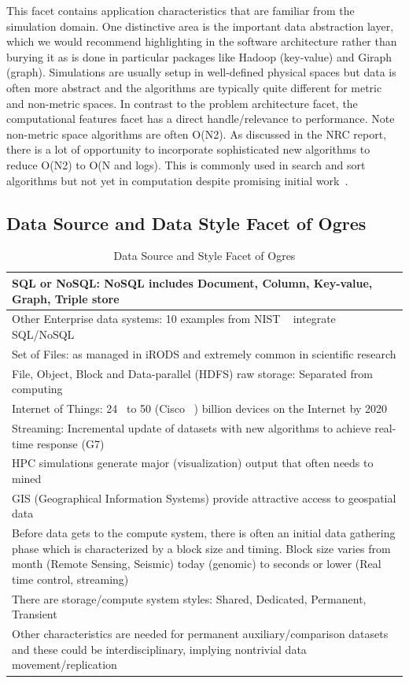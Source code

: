 \documentclass{acm_proc_article-sp}
\begin{document}
This facet contains application characteristics that are familiar from the simulation domain. One distinctive area is the important data abstraction layer, which we would recommend highlighting in the software architecture rather than burying it as is done in particular packages like Hadoop (key-value) and Giraph (graph). Simulations are usually setup in well-defined physical spaces but data is often more abstract and the algorithms are typically quite different for metric and non-metric spaces. In contrast to the problem architecture facet, the computational features facet has a direct handle/relevance to performance. Note non-metric space algorithms are often O(N2). As discussed in the NRC report, there is a lot of opportunity to incorporate sophisticated new algorithms to reduce O(N2) to O(N and logs). This is commonly used in search and sort algorithms but not yet in computation despite promising initial work~\cite{b13,b23,b19}.

\subsection{Data Source and Data Style Facet of Ogres}
\begin{table}
\centering
\caption{ Data Source and Style Facet of Ogres}
\label{Table8}
\begin{tabular}{|p{12cm}|} \hline
SQL or NoSQL: NoSQL includes Document, Column, Key-value, Graph, Triple store \\ \hline
Other Enterprise data systems: 10 examples from NIST ~\cite{bb} integrate SQL/NoSQL \\ \hline
Set of Files: as managed in iRODS and extremely common in scientific research \\ \hline
File, Object, Block and Data-parallel (HDFS) raw storage: Separated from computing \\ \hline
Internet of Things: 24 ~\cite{b22}to 50 (Cisco ~\cite{b11,b12}) billion devices on the Internet by 2020 \\ \hline
Streaming: Incremental update of datasets with new algorithms to achieve real-time response (G7) \\ \hline
HPC simulations generate major (visualization) output that often needs to mined \\ \hline
GIS (Geographical Information Systems) provide attractive access to geospatial data \\ \hline
Before data gets to the compute system, there is often an initial data gathering phase which is characterized by a block size and timing. Block size varies from month (Remote Sensing, Seismic) today (genomic) to seconds or lower (Real time control, streaming)\\ \hline
There are storage/compute system styles: Shared, Dedicated, Permanent, Transient \\ \hline
Other characteristics are needed for permanent auxiliary/comparison datasets and these could be interdisciplinary, implying nontrivial data movement/replication

\\ \hline
\end{tabular}
\end{table}
\end{document}
